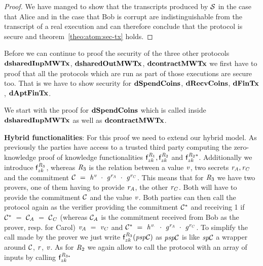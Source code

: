 \begin{proof}
    We have manged to show that the transcripts produced by $\mathcal{S}$ in the case that Alice and in the case that Bob is corrupt are indistinguishable from the transcript of a real execution and can therefore conclude that the protocol is secure and theorem~\ref{theo:atom:sec-tx} holds.

\end{proof}

Before we can continue to proof the security of the three other protocols $\mathbf{dsharedInpMWTx}$, $\mathbf{dsharedOutMWTx}$, $\mathbf{dcontractMWTx}$ we first have to proof that all the protocols which are run as part of those executions are secure too.
That is we have to show security for $\mathbf{dSpendCoins}$, $\mathbf{dRecvCoins}$, $\mathbf{dFinTx}$, $\mathbf{dAptFinTx}$.

We start with the proof for $\mathbf{dSpendCoins}$ which is called inside $\mathbf{dsharedInpMWTx}$ as well as $\mathbf{dcontractMWTx}$.

\textbf{Hybrid functionalities}: For this proof we need to extend our hybrid model.
As previously the parties have access to a trusted third party computing the zero-knowledge proof of knowledge functionalities $\mathsf{f}^{\mathit{R}_1}_{zk}, \mathsf{f}^{\mathit{R}_2}_{zk}$ and $\mathsf{f}^{\mathit{R}_2*}_{zk}$.
Additionally we introduce $\mathsf{f}^{\mathit{R}_3}_{zk}$, whereas $\mathit{R}_3$ is the relation between a value $\mathit{v}$, two secrets $\mathit{r}_{\mathit{A}}, \mathit{r}_{\mathit{C}}$ and the commitment $\mathcal{C} ~=~ \mathit{h}^{\mathit{v}} ~\cdot~ \mathit{g}^{\mathit{r}_{\mathit{A}}} ~\cdot~ \mathit{g}^{\mathit{r}_{\mathit{C}}}$. 
This means that for $\mathit{R}_3$ we have two provers, one of them having to provide $\mathit{r}_{\mathit{A}}$, the other $\mathit{r}_{\mathit{C}}$.
Both will have to provide the commitment $\mathcal{C}$ and the value $\mathit{v}$.
Both parties can then call the protocol again as the verifier providing the commitment $\mathcal{C}^*$ and receiving 1 if $\mathcal{C}^* ~=~ \mathcal{C}_{\mathit{A}} ~=~ \mathcal{C}_{\mathit{C}}$ (whereas $\mathcal{C}_{\mathit{A}}$ is the commitment received from Bob as the prover, resp. for Carol) $\mathit{v}_{\mathit{A}} ~=~ \mathit{v}_{\mathit{C}}$ and $\mathcal{C}^* ~=~ \mathit{h}^{\mathit{v}_{\cdot}} ~\cdot~ \mathit{g}^{\mathit{r}_{\mathit{A}}} ~\cdot~ \mathit{g}^{\mathit{r}_{\mathit{C}}}$.
To simplify the call made by the prover we just write $\mathsf{f}^{\mathit{R}_3}_{zk}(\mathit{psp}\mathcal{C})$ as $\mathit{psp}\mathcal{C}$ is like $\mathit{sp}\mathcal{C}$ a wrapper around $\mathcal{C}$, $\mathit{r}$, $\mathit{v}$.
As for $\mathit{R}_2$ we again allow to call the protocol with an array of inputs by calling $\mathsf{f}^{\mathit{R}_{3*}}_{zk}$

